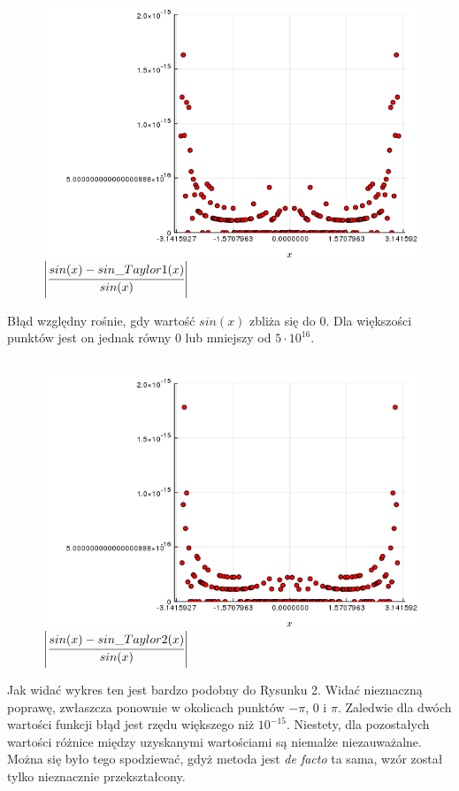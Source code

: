 \documentclass[a4paper]{article}
\begin{document}
\begin{figure}[h!]
  \includegraphics[width=14cm]{sin_Taylor1cut.png}
  \caption{$\left| \cfrac{sin(x) - sin\_Taylor1(x)}{sin(x)} \right| $}
\end{figure}
\pagebreak

Błąd względny rośnie, gdy wartość $sin(x)$ zbliża się do $0$. Dla większości punktów jest on jednak równy $0$ lub mniejszy od $ 5 \cdot 10^{16}$.\\\\

\begin{figure}[h!]
  \includegraphics[width=14cm]{sin_Taylor2.png}
  \caption{$\left| \cfrac{sin(x) - sin\_Taylor2(x)}{sin(x)} \right| $}
\end{figure}

Jak widać wykres ten jest bardzo podobny do Rysunku 2. Widać nieznaczną poprawę, zwłaszcza ponownie w okolicach punktów $-\pi$, $0$ i $\pi$. Zaledwie dla dwóch wartości funkcji błąd jest rzędu większego niż $10^{-15}$. Niestety, dla pozostałych wartości różnice między uzyskanymi wartościami są niemalże niezauważalne. Można się było tego spodziewać, gdyż metoda jest \textit{de facto} ta sama, wzór został tylko nieznacznie przekształcony.\\\
\end{document}
